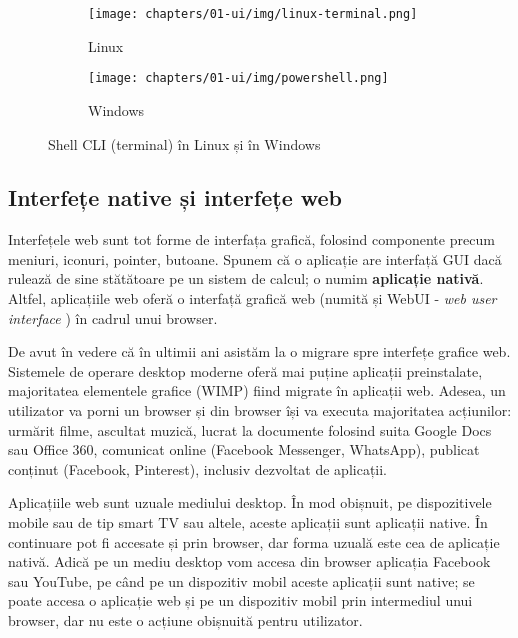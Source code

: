 \begin{figure}[!htbp]
  \centering
  \begin{subfigure}[b]{0.6\textwidth}
    \texttt{[image: chapters/01-ui/img/linux-terminal.png]}
    \caption{Linux}
    \label{fig:ui:shell-cli:linux}
  \end{subfigure}

  \begin{subfigure}[b]{0.6\textwidth}
    \texttt{[image: chapters/01-ui/img/powershell.png]}
    \caption{Windows}
    \label{fig:ui:shell-cli:windows}
  \end{subfigure}

  \caption{Shell CLI (terminal) în Linux și în Windows}
  \label{fig:ui:shell-cli-linux-windows}
\end{figure}

\newpage

\subsection{Interfețe native și interfețe web}
\label{sec:ui:native-web}

Interfețele web sunt tot forme de interfața grafică, folosind componente precum meniuri, iconuri, pointer, butoane.
Spunem că o aplicație are interfață GUI dacă rulează de sine stătătoare pe un sistem de calcul;
o numim \textbf{aplicație nativă}.
Altfel, aplicațiile web oferă o interfață grafică web (numită și WebUI - \textit{web user interface} ) în cadrul unui browser.

De avut în vedere că în ultimii ani asistăm la o migrare spre interfețe grafice web.
Sistemele de operare desktop moderne oferă mai puține aplicații preinstalate, majoritatea elementele grafice (WIMP) fiind migrate în aplicații web.
Adesea, un utilizator va porni un browser și din browser își va executa majoritatea acțiunilor: urmărit filme, ascultat muzică, lucrat la documente folosind suita Google Docs sau Office 360, comunicat online (Facebook Messenger, WhatsApp), publicat conținut (Facebook, Pinterest), inclusiv dezvoltat de aplicații.

Aplicațiile web sunt uzuale mediului desktop.
În mod obișnuit, pe dispozitivele mobile sau de tip smart TV sau altele, aceste aplicații sunt aplicații native.
În continuare pot fi accesate și prin browser, dar forma uzuală este cea de aplicație nativă.
Adică pe un mediu desktop vom accesa din browser aplicația Facebook sau YouTube, pe când pe un dispozitiv mobil aceste aplicații sunt native;
se poate accesa o aplicație web și pe un dispozitiv mobil prin intermediul unui browser, dar nu este o acțiune obișnuită pentru utilizator.

